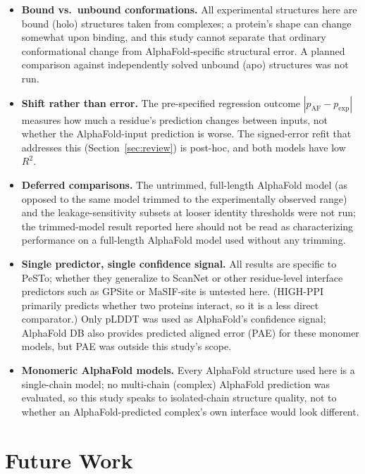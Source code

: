 \documentclass[10pt]{article}
\begin{document}
\begin{itemize}[nosep,leftmargin=1.4em]
\item \textbf{Bound vs.\ unbound conformations.} All experimental structures
here are bound (holo) structures taken from complexes; a protein's shape can
change somewhat upon binding, and this study cannot separate that ordinary
conformational change from AlphaFold-specific structural error. A planned
comparison against independently solved unbound (apo) structures was not
run.
\item \textbf{Shift rather than error.} The pre-specified regression
outcome $|p_{\mathrm{AF}} - p_{\mathrm{exp}}|$ measures how much a
residue's prediction changes between inputs, not whether the AlphaFold-input
prediction is worse. The signed-error refit that addresses this (Section~\ref{sec:review}) is post-hoc,
and both models have low $R^2$.
\item \textbf{Deferred comparisons.} The untrimmed, full-length AlphaFold
model (as opposed to the same model trimmed to the experimentally observed
range) and the leakage-sensitivity subsets at looser identity thresholds
were not run; the trimmed-model result reported here should not be read as
characterizing performance on a full-length AlphaFold model used without any
trimming.
\item \textbf{Single predictor, single confidence signal.} All results are
specific to PeSTo; whether they generalize to ScanNet \cite{tubiana2022} or
other residue-level interface predictors such as GPSite \cite{yuan2024} or
MaSIF-site \cite{gainza2020} is untested here. (HIGH-PPI \cite{gao2023}
primarily predicts whether two proteins interact, so it is a less direct
comparator.) Only pLDDT was used as AlphaFold's confidence signal; AlphaFold
DB also provides predicted aligned error (PAE) for these monomer models, but
PAE was outside this study's scope.
\item \textbf{Monomeric AlphaFold models.} Every AlphaFold structure used here
is a single-chain model; no multi-chain (complex) AlphaFold prediction was
evaluated, so this study speaks to isolated-chain structure quality, not to
whether an AlphaFold-predicted complex's own interface would look different.
\end{itemize}

\section{Future Work}
\end{document}
